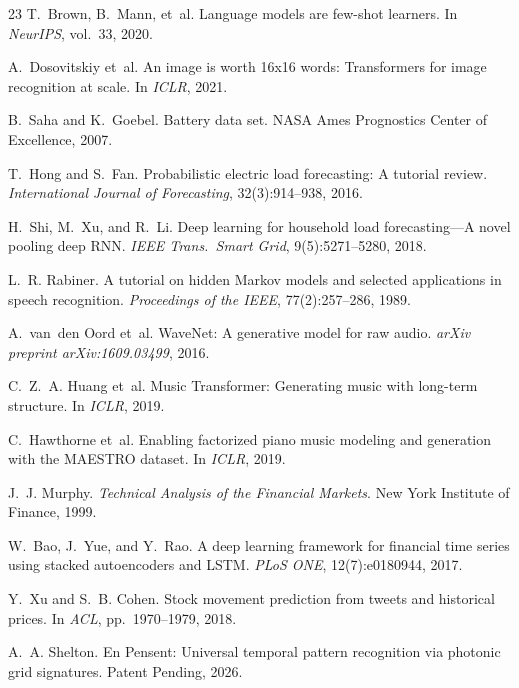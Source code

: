 \documentclass[11pt,a4paper]{article}
\begin{document}
\begin{thebibliography}{23}
T.~Brown, B.~Mann, et~al.
\newblock Language models are few-shot learners.
\newblock In \emph{NeurIPS}, vol.~33, 2020.

A.~Dosovitskiy et~al.
\newblock An image is worth 16x16 words: Transformers for image recognition at scale.
\newblock In \emph{ICLR}, 2021.

B.~Saha and K.~Goebel.
\newblock Battery data set.
\newblock NASA Ames Prognostics Center of Excellence, 2007.

T.~Hong and S.~Fan.
\newblock Probabilistic electric load forecasting: A tutorial review.
\newblock \emph{International Journal of Forecasting}, 32(3):914--938, 2016.

H.~Shi, M.~Xu, and R.~Li.
\newblock Deep learning for household load forecasting---A novel pooling deep RNN.
\newblock \emph{IEEE Trans.\ Smart Grid}, 9(5):5271--5280, 2018.

L.~R. Rabiner.
\newblock A tutorial on hidden Markov models and selected applications in speech recognition.
\newblock \emph{Proceedings of the IEEE}, 77(2):257--286, 1989.

A.~van~den Oord et~al.
\newblock WaveNet: A generative model for raw audio.
\newblock \emph{arXiv preprint arXiv:1609.03499}, 2016.

C.~Z.~A. Huang et~al.
\newblock Music Transformer: Generating music with long-term structure.
\newblock In \emph{ICLR}, 2019.

C.~Hawthorne et~al.
\newblock Enabling factorized piano music modeling and generation with the MAESTRO dataset.
\newblock In \emph{ICLR}, 2019.

J.~J. Murphy.
\newblock \emph{Technical Analysis of the Financial Markets}.
\newblock New York Institute of Finance, 1999.

W.~Bao, J.~Yue, and Y.~Rao.
\newblock A deep learning framework for financial time series using stacked autoencoders and LSTM.
\newblock \emph{PLoS ONE}, 12(7):e0180944, 2017.

Y.~Xu and S.~B. Cohen.
\newblock Stock movement prediction from tweets and historical prices.
\newblock In \emph{ACL}, pp.~1970--1979, 2018.

A.~A. Shelton.
\newblock En Pensent: Universal temporal pattern recognition via photonic grid signatures.
\newblock Patent Pending, 2026.

\end{thebibliography}
\end{document}
